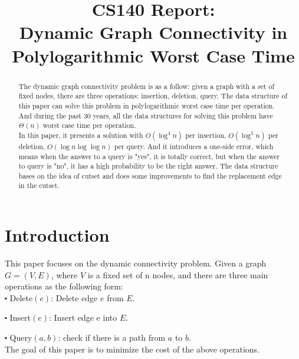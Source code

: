 \documentclass[conference,compsoc]{IEEEtran}
\begin{document}
\title{
	CS140 Report: \\Dynamic Graph Connectivity in Polylogarithmic Worst Case Time
}


\author{
}

\maketitle


\begin{abstract}
The dynamic graph connectivity problem is as a follow: given a graph with a set of fixed nodes, there are three operations: insertion, deletion, query. The data structure of this paper can solve this problem in polylogarithmic worst case time per operation. And during the past 30 years, all the data structures for solving this problem have $\Theta(n)$ worst case time per operation. 
\\
In this paper, it presents a solution with $O(\log^4n)$ per insertion, $O(\log^5n)$ per deletion, $O(\log n\log \log n)$ per query. And it introduces a one-side error, which means when the answer to a query is "yes", it is totally correct, but when the answer to query is "no", it has a high probability to be the right answer. The data structure bases on the idea of cutset and does some improvements to find the replacement edge in the cutset. 
\end{abstract}
\section{Introduction}
This paper focuses on the dynamic connectivity problem. Given a graph $G=(V,E)$, where $V$ is a fixed set of n nodes, and there are three main operations as the following form:\\

$\centerdot$ Delete$(e)$: Delete edge $e$ from $E$.

$\centerdot$ Insert$(e)$: Insert edge e into $E$.

$\centerdot$ Query$(a,b)$: check if there is a path from $a$ to $b$.\\

The goal of this paper is to minimize the cost of  the above operations. 
\end{document}
